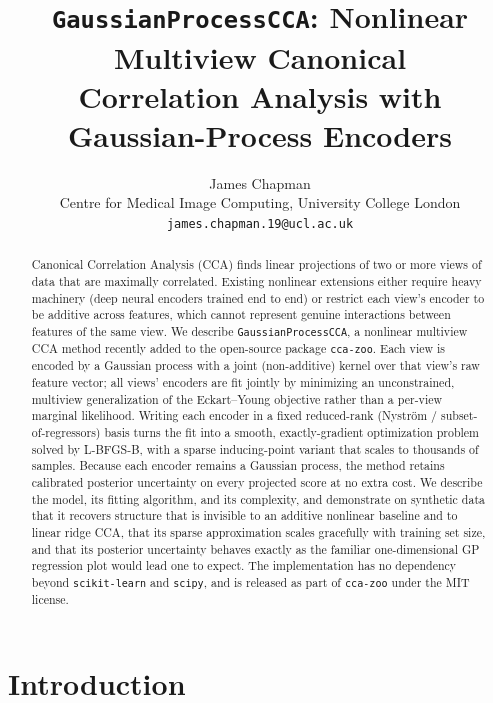 \documentclass[11pt]{article}
\title{\texttt{GaussianProcessCCA}: Nonlinear Multiview Canonical\\Correlation Analysis with Gaussian-Process Encoders}
\author{
James Chapman\\
Centre for Medical Image Computing, University College London\\
\texttt{james.chapman.19@ucl.ac.uk}
}
\date{}
\begin{document}
\maketitle

\begin{abstract}
Canonical Correlation Analysis (CCA) finds linear projections of two or more views of data that are maximally correlated. Existing nonlinear extensions either require heavy machinery (deep neural encoders trained end to end) or restrict each view's encoder to be additive across features, which cannot represent genuine interactions between features of the same view. We describe \texttt{GaussianProcessCCA}, a nonlinear multiview CCA method recently added to the open-source package \texttt{cca-zoo}. Each view is encoded by a Gaussian process with a joint (non-additive) kernel over that view's raw feature vector; all views' encoders are fit jointly by minimizing an unconstrained, multiview generalization of the Eckart--Young objective rather than a per-view marginal likelihood. Writing each encoder in a fixed reduced-rank (Nystr\"om / subset-of-regressors) basis turns the fit into a smooth, exactly-gradient optimization problem solved by L-BFGS-B, with a sparse inducing-point variant that scales to thousands of samples. Because each encoder remains a Gaussian process, the method retains calibrated posterior uncertainty on every projected score at no extra cost. We describe the model, its fitting algorithm, and its complexity, and demonstrate on synthetic data that it recovers structure that is invisible to an additive nonlinear baseline and to linear ridge CCA, that its sparse approximation scales gracefully with training set size, and that its posterior uncertainty behaves exactly as the familiar one-dimensional GP regression plot would lead one to expect. The implementation has no dependency beyond \texttt{scikit-learn} and \texttt{scipy}, and is released as part of \texttt{cca-zoo} under the MIT license.
\end{abstract}

\section{Introduction}
\end{document}
